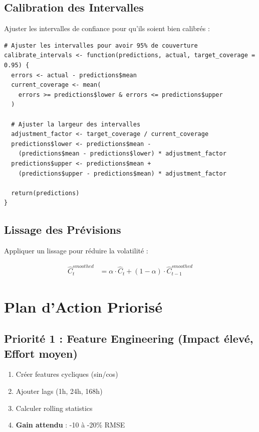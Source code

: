 \documentclass[12pt,a4paper]{article}
\begin{document}
\subsection{Calibration des Intervalles}

Ajuster les intervalles de confiance pour qu'ils soient bien calibrés :

\begin{verbatim}
# Ajuster les intervalles pour avoir 95% de couverture
calibrate_intervals <- function(predictions, actual, target_coverage = 0.95) {
  errors <- actual - predictions$mean
  current_coverage <- mean(
    errors >= predictions$lower & errors <= predictions$upper
  )
  
  # Ajuster la largeur des intervalles
  adjustment_factor <- target_coverage / current_coverage
  predictions$lower <- predictions$mean - 
    (predictions$mean - predictions$lower) * adjustment_factor
  predictions$upper <- predictions$mean + 
    (predictions$upper - predictions$mean) * adjustment_factor
  
  return(predictions)
}
\end{verbatim}

\subsection{Lissage des Prévisions}

Appliquer un lissage pour réduire la volatilité :

\begin{align}
    \hat{C}_t^{smoothed} &= \alpha \cdot \hat{C}_t + (1-\alpha) \cdot \hat{C}_{t-1}^{smoothed}
\end{align}

\section{Plan d'Action Priorisé}

\subsection{Priorité 1 : Feature Engineering (Impact élevé, Effort moyen)}

\begin{enumerate}
    \item Créer features cycliques (sin/cos)
    \item Ajouter lags (1h, 24h, 168h)
    \item Calculer rolling statistics
    \item \textbf{Gain attendu} : -10 à -20\% RMSE
\end{enumerate}
\end{document}
